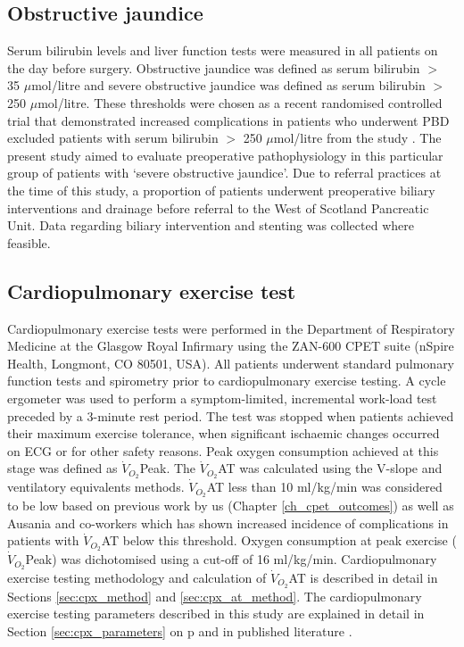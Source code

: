 \subsection{Obstructive jaundice}
Serum bilirubin levels and liver function tests were measured in all patients on the day before surgery. 
Obstructive jaundice was defined as serum bilirubin $>$ 35 $\mu$mol/litre and severe obstructive jaundice was defined as serum bilirubin $>$ 250 $\mu$mol/litre. 
These thresholds were chosen as a recent randomised controlled trial that demonstrated increased complications in patients who underwent PBD excluded patients with serum bilirubin $>$ 250 $\mu$mol/litre from the study \parencite{van_der_gaag_preoperative_2010}.
The present study aimed to evaluate preoperative pathophysiology in this particular group of patients with `severe obstructive jaundice'.
Due to referral practices at the time of this study, a proportion of patients underwent preoperative biliary interventions and drainage before referral to the West of Scotland Pancreatic Unit. 
Data regarding biliary intervention and stenting was collected where feasible.

\subsection{Cardiopulmonary exercise test}
Cardiopulmonary exercise tests were performed in the Department of Respiratory Medicine at the Glasgow Royal Infirmary using the ZAN-600 CPET suite (nSpire Health, Longmont, CO 80501, USA). 
All patients underwent standard pulmonary function tests and spirometry prior to cardiopulmonary exercise testing. 
A cycle ergometer was used to perform a symptom-limited, incremental work-load test preceded by a 3-minute rest period. 
The test was stopped when patients achieved their maximum exercise tolerance, when significant ischaemic changes occurred on ECG or for other safety reasons. 
Peak oxygen consumption achieved at this stage was defined as $\dot{V}_{O_2}$Peak. 
The $\dot{V}_{O_2}$AT was calculated using the V-slope \parencite{beaver_new_1986,sue_metabolic_1988} and ventilatory equivalents \parencite{society_ats/accp_2003} methods.
$\dot{V}_{O_2}$AT less than 10 ml/kg/min was considered to be low based on previous work by us (Chapter \ref{ch_cpet_outcomes}) as well as Ausania and co-workers \parencite{ausania_effects_2012} which has shown increased incidence of complications in patients with $\dot{V}_{O_2}$AT below this threshold. 
Oxygen consumption at peak exercise ($\dot{V}_{O_2}$Peak) was dichotomised using a cut-off of 16 ml/kg/min. 
Cardiopulmonary exercise testing methodology and calculation of $\dot{V}_{O_2}$AT is described in detail in Sections \ref{sec:cpx_method} and \ref{sec:cpx_at_method}.
The cardiopulmonary exercise testing parameters described in this study are explained in detail in Section \ref{sec:cpx_parameters} on p\pageref{sec:cpx_parameters} and in published literature \parencite{balady_clinicians_2010}.

